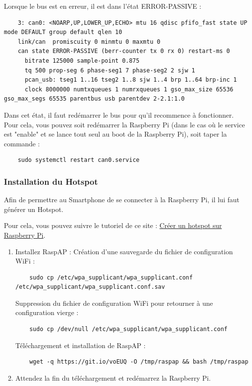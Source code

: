 Lorsque le bus est en erreur, il est dans l'état ERROR-PASSIVE :
\vspace{-1.8\baselineskip} 
\begin{lstlisting}
    3: can0: <NOARP,UP,LOWER_UP,ECHO> mtu 16 qdisc pfifo_fast state UP mode DEFAULT group default qlen 10
    link/can  promiscuity 0 minmtu 0 maxmtu 0 
    can state ERROR-PASSIVE (berr-counter tx 0 rx 0) restart-ms 0 
	  bitrate 125000 sample-point 0.875 
	  tq 500 prop-seg 6 phase-seg1 7 phase-seg2 2 sjw 1
	  pcan_usb: tseg1 1..16 tseg2 1..8 sjw 1..4 brp 1..64 brp-inc 1
	  clock 8000000 numtxqueues 1 numrxqueues 1 gso_max_size 65536 gso_max_segs 65535 parentbus usb parentdev 2-2.1:1.0  
\end{lstlisting}
Dans cet état, il faut redémarrer le bus pour qu'il recommence à fonctionner. Pour cela, vous pouvez soit redémarrer la Raspberry Pi (dans le cas où le service est "enable" et se lance tout seul au boot de la Raspberry Pi), soit taper la commande : 
\vspace{-1.8\baselineskip} 
\begin{lstlisting}
    sudo systemctl restart can0.service
\end{lstlisting}

\subsubsection{Installation du Hotspot}
Afin de permettre au Smartphone de se connecter à la Raspberry Pi, il lui faut générer un Hotspot. 

Pour cela, vous pouvez suivre le tutoriel de ce site : \href{https://bentek.fr/creer-hotspot-wifi-sur-raspberry-pi/}{Créer un hotspot sur Raspberry Pi}.
\begin{enumerate}
    \item Installez RaspAP : \newline
    Création d'une sauvegarde du fichier de configuration WiFi :
\vspace{-1.8\baselineskip} 
\begin{lstlisting}
    sudo cp /etc/wpa_supplicant/wpa_supplicant.conf /etc/wpa_supplicant/wpa_supplicant.conf.sav
\end{lstlisting}
    Suppression du fichier de configuration WiFi pour retourner à une configuration vierge :
\vspace{-1.8\baselineskip} 
\begin{lstlisting}
    sudo cp /dev/null /etc/wpa_supplicant/wpa_supplicant.conf
\end{lstlisting}
    Téléchargement et installation de RaspAP :
\vspace{-1.8\baselineskip} 
\begin{lstlisting}
    wget -q https://git.io/voEUQ -O /tmp/raspap && bash /tmp/raspap
\end{lstlisting}
    \item Attendez la fin du téléchargement et redémarrez la Raspberry Pi.\newline
\end{enumerate}

